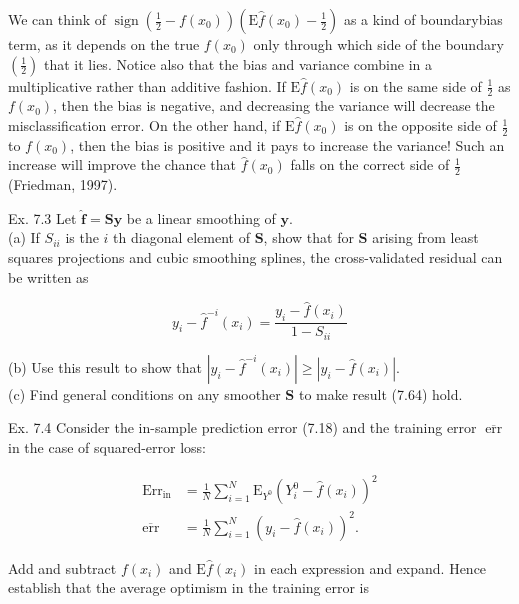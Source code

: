 \documentclass[10pt]{article}
\begin{document}
We can think of $\operatorname{sign}\left(\frac{1}{2}-f\left(x_{0}\right)\right)\left(\mathrm{E} \hat{f}\left(x_{0}\right)-\frac{1}{2}\right)$ as a kind of boundarybias term, as it depends on the true $f\left(x_{0}\right)$ only through which side of the boundary $\left(\frac{1}{2}\right)$ that it lies. Notice also that the bias and variance combine in a multiplicative rather than additive fashion. If $\mathrm{E} \hat{f}\left(x_{0}\right)$ is on the same side of $\frac{1}{2}$ as $f\left(x_{0}\right)$, then the bias is negative, and decreasing the variance will decrease the misclassification error. On the other hand, if $\mathrm{E} \hat{f}\left(x_{0}\right)$ is on the opposite side of $\frac{1}{2}$ to $f\left(x_{0}\right)$, then the bias is positive and it pays to increase the variance! Such an increase will improve the chance that $\hat{f}\left(x_{0}\right)$ falls on the correct side of $\frac{1}{2}$ (Friedman, 1997).

Ex. 7.3 Let $\hat{\mathbf{f}}=\mathbf{S y}$ be a linear smoothing of $\mathbf{y}$.\\
(a) If $S_{i i}$ is the $i$ th diagonal element of $\mathbf{S}$, show that for $\mathbf{S}$ arising from least squares projections and cubic smoothing splines, the cross-validated residual can be written as


\begin{equation*}
y_{i}-\hat{f}^{-i}\left(x_{i}\right)=\frac{y_{i}-\hat{f}\left(x_{i}\right)}{1-S_{i i}} \tag{7.64}
\end{equation*}


(b) Use this result to show that $\left|y_{i}-\hat{f}^{-i}\left(x_{i}\right)\right| \geq\left|y_{i}-\hat{f}\left(x_{i}\right)\right|$.\\
(c) Find general conditions on any smoother $\mathbf{S}$ to make result (7.64) hold.

Ex. 7.4 Consider the in-sample prediction error (7.18) and the training error $\overline{\operatorname{err}}$ in the case of squared-error loss:

$$
\begin{aligned}
\operatorname{Err}_{\mathrm{in}} & =\frac{1}{N} \sum_{i=1}^{N} \mathrm{E}_{Y^{0}}\left(Y_{i}^{0}-\hat{f}\left(x_{i}\right)\right)^{2} \\
\overline{\mathrm{err}} & =\frac{1}{N} \sum_{i=1}^{N}\left(y_{i}-\hat{f}\left(x_{i}\right)\right)^{2} .
\end{aligned}
$$

Add and subtract $f\left(x_{i}\right)$ and $\mathrm{E} \hat{f}\left(x_{i}\right)$ in each expression and expand. Hence establish that the average optimism in the training error is
\end{document}
